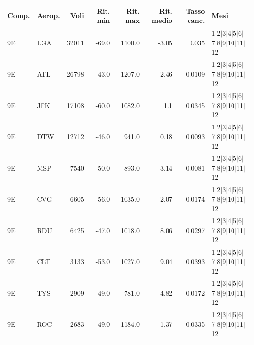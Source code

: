 \begin{tabular}{@{}l l rrrrr l@{}}
\toprule
Comp. & Aerop. & Voli & Rit. min & Rit. max & Rit. medio & Tasso canc. & Mesi \\
\midrule
9E & LGA & 32011 & -69.0 & 1100.0 & -3.05 & 0.035 & 1$|$2$|$3$|$4$|$5$|$6$|$7$|$8$|$9$|$10$|$11$|$12 \\
9E & ATL & 26798 & -43.0 & 1207.0 & 2.46 & 0.0109 & 1$|$2$|$3$|$4$|$5$|$6$|$7$|$8$|$9$|$10$|$11$|$12 \\
9E & JFK & 17108 & -60.0 & 1082.0 & 1.1 & 0.0345 & 1$|$2$|$3$|$4$|$5$|$6$|$7$|$8$|$9$|$10$|$11$|$12 \\
9E & DTW & 12712 & -46.0 & 941.0 & 0.18 & 0.0093 & 1$|$2$|$3$|$4$|$5$|$6$|$7$|$8$|$9$|$10$|$11$|$12 \\
9E & MSP & 7540 & -50.0 & 893.0 & 3.14 & 0.0081 & 1$|$2$|$3$|$4$|$5$|$6$|$7$|$8$|$9$|$10$|$11$|$12 \\
9E & CVG & 6605 & -56.0 & 1035.0 & 2.07 & 0.0174 & 1$|$2$|$3$|$4$|$5$|$6$|$7$|$8$|$9$|$10$|$11$|$12 \\
9E & RDU & 6425 & -47.0 & 1018.0 & 8.06 & 0.0297 & 1$|$2$|$3$|$4$|$5$|$6$|$7$|$8$|$9$|$10$|$11$|$12 \\
9E & CLT & 3133 & -53.0 & 1027.0 & 9.04 & 0.0393 & 1$|$2$|$3$|$4$|$5$|$6$|$7$|$8$|$9$|$10$|$11$|$12 \\
9E & TYS & 2909 & -49.0 & 781.0 & -4.82 & 0.0172 & 1$|$2$|$3$|$4$|$5$|$6$|$7$|$8$|$9$|$10$|$11$|$12 \\
9E & ROC & 2683 & -49.0 & 1184.0 & 1.37 & 0.0335 & 1$|$2$|$3$|$4$|$5$|$6$|$7$|$8$|$9$|$10$|$11$|$12 \\
\bottomrule
\end{tabular}